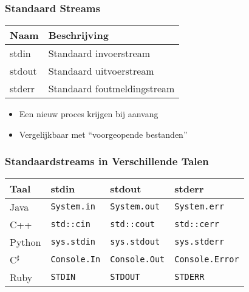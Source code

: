 \begin{frame}
  \frametitle{Standaard Streams}
  \begin{center}
    \begin{tabular}{ll}
      \bfseries Naam & \bfseries Beschrijving \\
      \toprule
      \ttfamily stdin  & Standaard invoerstream \\
      \ttfamily stdout & Standaard uitvoerstream \\
      \ttfamily stderr & Standaard foutmeldingstream \\
      \bottomrule
    \end{tabular}
  \end{center}
  \vskip4mm
  \begin{itemize}
    \item Een nieuw proces krijgen bij aanvang 
    \item Vergelijkbaar met ``voorgeopende bestanden''
  \end{itemize}
  \begin{center}
  \end{center}
\end{frame}

\begin{frame}
  \frametitle{Standaardstreams in Verschillende Talen}
  \begin{center}
    \begin{tabular}{llll}
      \bfseries Taal & \bfseries stdin & \bfseries stdout & \bfseries stderr \\
      \toprule
      Java & \texttt{System.in} & \texttt{System.out} & \texttt{System.err} \\
      C++ & \texttt{std::cin} & \texttt{std::cout} & \texttt{std::cerr} \\
      Python & \texttt{sys.stdin} & \texttt{sys.stdout} & \texttt{sys.stderr} \\
      C$^\sharp$ & \texttt{Console.In} & \texttt{Console.Out} & \texttt{Console.Error} \\
      Ruby & \texttt{STDIN} & \texttt{STDOUT} & \texttt{STDERR} \\
      \bottomrule
    \end{tabular}
  \end{center}
\end{frame}


